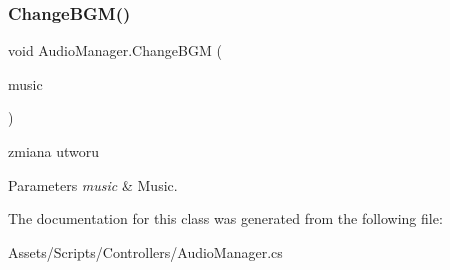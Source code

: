 \subsubsection{\texorpdfstring{Change\+B\+G\+M()}{ChangeBGM()}}
{\footnotesize\ttfamily void Audio\+Manager.\+Change\+B\+GM (\begin{DoxyParamCaption}\item[{Audio\+Clip}]{music }\end{DoxyParamCaption})}



zmiana utworu 


\begin{DoxyParams}{Parameters}
{\em music} & Music.\\
\hline
\end{DoxyParams}


The documentation for this class was generated from the following file\+:\begin{DoxyCompactItemize}
\item 
Assets/\+Scripts/\+Controllers/Audio\+Manager.\+cs\end{DoxyCompactItemize}
